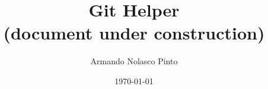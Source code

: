 \documentclass[11pt,oneside,openright]{phdthesis}
\begin{document}
\title{Git Helper \\ (document under construction)}
\author{Armando Nolasco Pinto}
\date{\today}
\maketitle


\tableofcontents

%

%
%
%
%
%
%
%
%
%
%
%

%

\pagebreak

%
%


\end{document}
